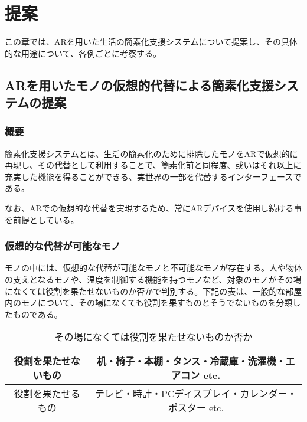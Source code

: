 
\chapter{提案}
\label{chap:suggestion}

この章では、ARを用いた生活の簡素化支援システムについて提案し、その具体的な用途について、各例ごとに考察する。

\newpage

\section{ARを用いたモノの仮想的代替による簡素化支援システムの提案}
\label{chap:suggestionDetail}

\subsection{概要}

簡素化支援システムとは、生活の簡素化のために排除したモノをARで仮想的に再現し、その代替として利用することで、簡素化前と同程度、或いはそれ以上に充実した機能を得ることができる、実世界の一部を代替するインターフェースである。

なお、ARでの仮想的な代替を実現するため、常にARデバイスを使用し続ける事を前提としている。

\subsection{仮想的な代替が可能なモノ}

モノの中には、仮想的な代替が可能なモノと不可能なモノが存在する。人や物体の支えとなるモノや、温度を制御する機能を持つモノなど、対象のモノがその場になくては役割を果たせないものか否かで判別する。下記の表は、一般的な部屋内のモノについて、その場になくても役割を果すものとそうでないものを分類したものである。

\begin{table}[htbp]
    \caption{その場になくては役割を果たせないものか否か}
    \label{tb:mono}
    \begin{center}\begin{tabular}{c|c}
      \hline
      役割を果たせないもの&机・椅子・本棚・タンス・冷蔵庫・洗濯機・エアコン etc.\\\hline
      役割を果たせるもの&テレビ・時計・PCディスプレイ・カレンダー・ポスター etc.\\\hline
    \end{tabular}\end{center}
\end{table}


